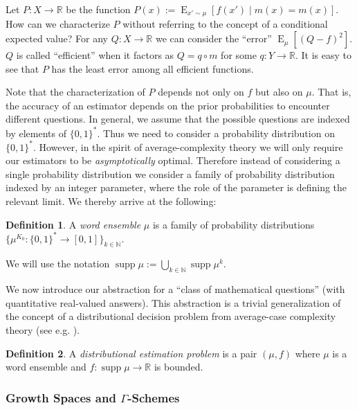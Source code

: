 \documentclass{article}
\numberwithin{equation}{section}
\theoremstyle{definition}
\newtheorem{definition}{Definition}[section]
\theoremstyle{plain}
\newcommand{\Bool}{\{0,1\}}
\newcommand{\Words}{{\Bool^*}}
\DeclareMathOperator{\Supp}{supp}
\DeclareMathOperator{\E}{E}
\newcommand{\Nats}{\mathbb{N}}
\newcommand{\Reals}{\mathbb{R}}
\begin{document}
Let $P: X \rightarrow \Reals$ be the function $P(x) := \E_{x' \sim \mu}[f(x') \mid m(x) = m(x)]$. How can we characterize $P$ without referring to the concept of a conditional expected value? For any $Q: X \rightarrow \Reals$ we can consider the \enquote{error} $\E_\mu[(Q - f)^2]$. $Q$ is called \enquote{efficient} when it factors as $Q = q \circ m$ for some $q: Y \rightarrow \Reals$. It is easy to see that $P$ has the least error among all efficient functions.

Note that the characterization of $P$ depends not only on $f$ but also on $\mu$. That is, the accuracy of an estimator depends on the prior probabilities to encounter different questions. In general, we assume that the possible questions are indexed by elements of $\Words$. Thus we need to consider a probability distribution on $\Words$. However, in the spirit of average-complexity theory we will only require our estimators to be \emph{asymptotically} optimal. Therefore instead of considering a single probability distribution we consider a family of probability distribution indexed by an integer parameter, where the role of the parameter is defining the relevant limit. We thereby arrive at the following:

\begin{definition}

A \emph{word ensemble} $\mu$ is a family of probability distributions $\{\mu^{K_0}: \Words \rightarrow [0,1]\}_{k \in \Nats}$.

We will use the notation $\Supp \mu := \bigcup_{k \in \Nats} \Supp \mu^k$.

\end{definition}

We now introduce our abstraction for a \enquote{class of mathematical questions} (with quantitative real-valued answers). This abstraction is a trivial generalization of the concept of a distributional decision problem from average-case complexity theory (see e.g. \cite{Bogdanov_2006}).

\begin{definition}

A \emph{distributional estimation problem} is a pair $(\mu,f)$ where $\mu$ is a word ensemble and $f: \Supp \mu \rightarrow \Reals$ is bounded.

\end{definition}

\subsubsection{Growth Spaces and \texorpdfstring{$\Gamma$}{Γ}-Schemes}
\end{document}
